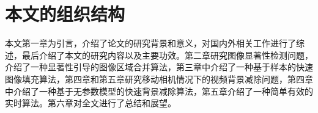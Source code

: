 \section{本文的组织结构}
本文第一章为引言，介绍了论文的研究背景和意义，对国内外相关工作进行了综述，最后介绍了本文的研究内容以及主要功效。第二章研究图像显著性检测问题，介绍了一种显著性引导的图像区域合并算法，第三章中介绍了一种基于样本的快速图像填充算法，第四章和第五章研究移动相机情况下的视频背景减除问题，第四章中介绍了一种基于无参数模型的快速背景减除算法，第五章介绍了一种简单有效的实时算法。第六章对全文进行了总结和展望。
\label{sec:hierarchy} 